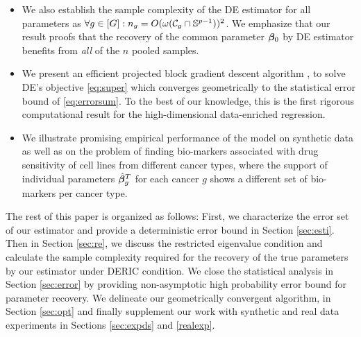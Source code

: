 \begin{itemize}[leftmargin = .4cm]
	\item We also establish the sample complexity of the DE estimator for all parameters as $\forall g \in [G]: n_g = O(\omega({\cal C}_g \cap \mathbb S^{p-1}))^2$. We emphasize that our result proofs that the recovery of the common parameter $\boldsymbol{\beta}_0$ by DE estimator benefits from \emph{all} of the $n$ pooled samples.
	\item We present an efficient projected block gradient descent algorithm \emph{\dc}, to solve DE's objective \eqref{eq:super} which converges geometrically to the statistical error bound of \eqref{eq:errorsum}. To the best of our knowledge, this is the first rigorous computational result for the high-dimensional data-enriched regression.
	\item We illustrate promising empirical performance of the model on synthetic data as well as on the problem of finding bio-markers associated with drug sensitivity of cell lines from different cancer types, where the support of individual parameters $\hat{\boldsymbol{\beta}}_g^T$ for each cancer $g$ shows a different set of bio-markers per cancer type.
\end{itemize}

The rest of this paper is organized as follows:
First, we characterize the error set of our estimator and provide a deterministic error bound in Section \ref{sec:esti}.
Then in Section \ref{sec:re}, we discuss the restricted eigenvalue condition and calculate the sample complexity required for the recovery of the true parameters by our estimator under DERIC condition.
We close the statistical analysis in Section \ref{sec:error} by providing non-asymptotic high probability error bound for parameter recovery.
We delineate our geometrically convergent algorithm, \dc in Section \ref{sec:opt} and finally supplement our work with synthetic and real data experiments in Sections \ref{sec:expds} and \ref{realexp}.


